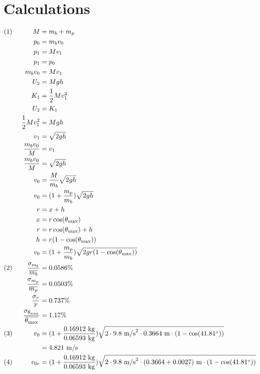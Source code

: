 \documentclass[12pt]{article}
\begin{document}
    \section{Calculations}
        \begin{alignat*}{3}
            (1)~ 
            && M & = m_b + m_p\\
            &&p_0 &= m_bv_0\\
            &&p_1 &= Mv_1\\
            &&p_1 &= p_0\\
            &&m_b v_0 &= Mv_1\\
            &&U_2 &= Mgh\\
            &&K_1 &= \frac{1}{2}Mv_1^2\\
            &&U_2 &= K_1\\
            &&\frac{1}{2}Mv_1^2 &= Mgh\\
            &&v_1 &= \sqrt{2gh}\\
            &&\frac{m_bv_0}{M} &= v_1\\
            &&\frac{m_bv_0}{M} &= \sqrt{2gh}\\
            &&v_0 &= \frac{M}{m_b}\sqrt{2gh}\\
            &&v_0 &= (1+\frac{m_p}{m_b})\sqrt{2gh}\\
            &&r &= x + h\\
            &&x &= r\cos(\theta_{\mathrm{max}})\\
            &&r &=r\cos(\theta_{\mathrm{max}}) + h\\
            &&h &=r(1-\cos(\theta_{\mathrm{max}}))\\
            &&v_0 &= (1+\frac{m_p}{m_b})\sqrt{2gr(1-\cos(\theta_{\mathrm{max}}))}\\
            (2)~
            &&\frac{\sigma_{m_b}}{\overline{m_b}} &= 0.0586\%\\
            &&\frac{\sigma_{m_p}}{\overline{m_p}} &= 0.0503\%\\
            &&\frac{\sigma_r}{\overline{r}} &= 0.737\%\\
            &&\frac{\sigma_{\theta_{\mathrm{max}}}}{\overline{\theta_{\mathrm{max}}}} &= 1.17\%\\
            (3)~
            &&v_0 & = (1+\frac{0.16912~\mathrm{kg}}{0.06593~\mathrm{kg}})\sqrt{2\cdot 9.8~ \mathrm{m/s}^2\cdot 0.3664~\mathrm{m}\cdot(1-\cos(41.81\degree))}\\
            &&&= 4.821~\mathrm{m/s}\\
            (4)~
            &&v_{0r} &= (1+\frac{0.16912~\mathrm{kg}}{0.06593~\mathrm{kg}})\sqrt{2\cdot 9.8~ \mathrm{m/s}^2\cdot (0.3664+0.0027)~\mathrm{m}\cdot(1-\cos(41.81\degree))}\\

\end{alignat*}
\end{document}
